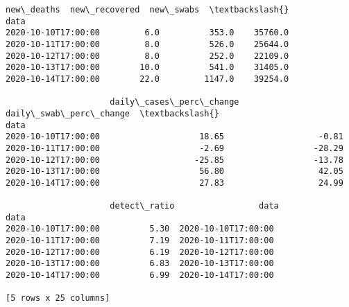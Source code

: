 \documentclass[11pt]{article}
\begin{document}
\begin{tcolorbox}[breakable, size=fbox, boxrule=.5pt, pad at break*=1mm, opacityfill=0]
\begin{Verbatim}[commandchars=\\\{\}]
                     new\_deaths  new\_recovered  new\_swabs  \textbackslash{}
data
2020-10-10T17:00:00         6.0          353.0    35760.0
2020-10-11T17:00:00         8.0          526.0    25644.0
2020-10-12T17:00:00         8.0          252.0    22109.0
2020-10-13T17:00:00        10.0          541.0    31405.0
2020-10-14T17:00:00        22.0         1147.0    39254.0

                     daily\_cases\_perc\_change  daily\_swab\_perc\_change  \textbackslash{}
data
2020-10-10T17:00:00                    18.65                   -0.81
2020-10-11T17:00:00                    -2.69                  -28.29
2020-10-12T17:00:00                   -25.85                  -13.78
2020-10-13T17:00:00                    56.80                   42.05
2020-10-14T17:00:00                    27.83                   24.99

                     detect\_ratio                 data
data
2020-10-10T17:00:00          5.30  2020-10-10T17:00:00
2020-10-11T17:00:00          7.19  2020-10-11T17:00:00
2020-10-12T17:00:00          6.19  2020-10-12T17:00:00
2020-10-13T17:00:00          6.83  2020-10-13T17:00:00
2020-10-14T17:00:00          6.99  2020-10-14T17:00:00

[5 rows x 25 columns]
\end{Verbatim}
\end{tcolorbox}
        
\end{document}
